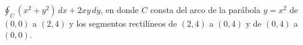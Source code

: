 \item $\oint_C (x^2 + y^2) \, dx + 2xy \, dy$, en donde $C$ consta del arco de la parábola $y = x^2$ de $(0, 0)$ a $(2, 4)$ y los segmentos rectilíneos de $(2, 4)$ a $(0, 4)$ y de $(0, 4)$ a $(0, 0)$.

